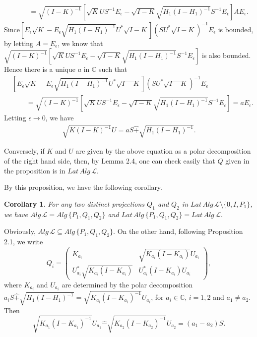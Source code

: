 \documentclass[12pt]{article}
\newtheorem{corollary}{Corollary}[section]
\newcommand{\LLL}{\mathcal L} %
\newcommand{\C}{\mathbb C} %
\begin{document}
{\begin{align*}
& \qquad = \sqrt{(I-K)^{-1}}\left[\sqrt{K}US^{-1}E_{\epsilon} -
\sqrt{I-K}\sqrt{H_{1}(I-H_{1})^{-1}}S^{-1}E_{\epsilon}\right] A E_\epsilon .
\end{align*}
Since$\left[ E_\epsilon\sqrt{K} -
E_\epsilon\sqrt{H_{1}(I-H_{1})^{-1}}U^{*}\sqrt{I-K}\right](SU^{*}\sqrt{I-K})^{-1}E_\epsilon
$ is bounded, by letting $A = E_\epsilon$, we know that
$\sqrt{(I-K)^{-1}}\left[\sqrt{K}US^{-1}E_{\epsilon} -
\sqrt{I-K}\sqrt{H_{1}(I-H_{1})^{-1}}S^{-1}E_{\epsilon}\right]$ is
also bounded. Hence there is a unique $a$ in $\mathbb{C}$ such that
\begin{align*}
&[E_\epsilon\sqrt{K} -
E_\epsilon\sqrt{H_{1}(I-H_{1})^{-1}}U^{*}\sqrt{I-K}](SU^{*}\sqrt{I-K})^{-1}E_\epsilon
\\
& \qquad =\sqrt{(I-K)^{-1}}\left[\sqrt{K}US^{-1}E_{\epsilon} -
\sqrt{I-K}\sqrt{H_{1}(I-H_{1})^{-1}}S^{-1}E_{\epsilon}\right] = a
E_\epsilon.
\end{align*}
Letting $\epsilon \rightarrow 0$, we have
\begin{align*}
\sqrt{K(I-K)^{-1}}U = aS\widehat{+} \sqrt{H_{1}(I-H_{1})^{-1}}.
\end{align*}

Conversely, if  $K$ and $U$ are given by the above equation as a
polar decomposition of the right hand side, then, by Lemma 2.4, one
can check easily that $Q$ given in the proposition is in
$Lat\,Alg\,\LLL$. \vspace{2mm}

By this proposition, we have the following corollary.

\begin{corollary}
For any two distinct projections $Q_1$ and $Q_2$ in $Lat\,Alg\,\LLL
\setminus \{ 0, I, P_1 \}$, we have  $ Alg\,\LLL =  Alg\,\{P_1, Q_1,
Q_2\}$ and $Lat\,Alg\,\{P_1, Q_1, Q_2 \} = Lat\,Alg\,\LLL.$
\end{corollary}

\quad Obviously, $ Alg\,\LLL\subseteq
Alg\,\{P_1, Q_1, Q_2 \}$. On the other hand, following Proposition
2.1, we write
$$Q_i= \left(\begin{array}{cc}K_{a_i}
& \sqrt{K_{a_i}(I-K_{a_i})}U_{a_i} \\U_{a_i}^{*}\sqrt{K_{a_i}(I-K_{a_i})} &
U_{a_i}^{*}(I-K_{a_i})U_{a_i}
\end{array}\right),
$$ where  $K_{a_i}$ and $U_{a_i}$ are determined by the polar
decomposition $a_i S\widehat{+ }\sqrt{H_{1}(I-H_{1})^{-1}}=
\sqrt{K_{a_i}(I-K_{a_i})^{-1}} U_{a_i}$, for $a_i\in \C$, $i=1,2$
and $a_1\neq a_2$. Then $$\sqrt{K_{a_1}(I-K_{a_1})^{-1}}
U_{a_1}\widehat{-}\sqrt{K_{a_2}(I-K_{a_2})^{-1}}
U_{a_2}=(a_1-a_2)S.$$

}
\end{document}
